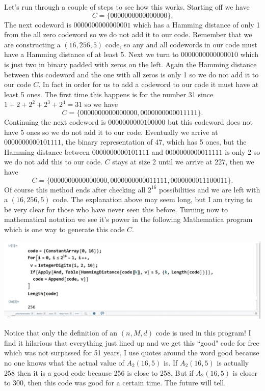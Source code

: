 \documentclass{article}
\theoremstyle{remark}
\begin{document}
	\noindent Let's run through a couple of steps to see how this works.  Starting off we have
	\begin{equation*}
		C=\{0000000000000000\}.
	\end{equation*}
	The next codeword is $0000000000000001$ which has a Hamming distance of only 1 from the all zero codeword so we do not add it to our code.  Remember that we are constructing a $(16,256,5)$ code, so any and all codewords in our code must have a Hamming distance of at least 5.  Next we turn to $0000000000000010$ which is just two in binary padded with zeros on the left.  Again the Hamming distance between this codeword and the one with all zeros is only 1 so we do not add it to our code $C$.  In fact in order for us to add a codeword to our code it must have at least 5 ones.  The first time this happens is for the number 31 since $1+2+2^2+2^3+2^4=31$ so we have
	\begin{equation*}
		C=\{0000000000000000,0000000000011111\}.
	\end{equation*}
	Continuing the next codeword is $0000000000100000$ but this codeword does not have 5 ones so we do not add it to our code.  Eventually we arrive at $0000000000101111$, the binary representation of 47, which has 5 ones, but the Hamming distance between $0000000000101111$ and $0000000000011111$ is only 2 so we do not add this to our code.  $C$ stays at size 2 until we arrive at 227, then we have
	\begin{equation*}
		C=\{0000000000000000,0000000000011111,0000000011100011\}.
	\end{equation*}
	Of course this method ends after checking all $2^{16}$ possibilities and we are left with a $(16,256,5)$ code.  The explanation above may seem long, but I am trying to be very clear for those who have never seen this before.  Turning now to mathematical notation we see it's power in the following Mathematica program which is one way to generate this code $C$.
	\begin{center}
		\includegraphics[width=15cm]{sequential code}
	\end{center}
	Notice that only the definition of an $(n,M,d)$ code is used in this program! I find it hilarious that everything just lined up and we get this ``good" code for free which was not surpassed for 51 years.  I use quotes around the word good because no one knows what the actual value of $A_2(16,5)$ is.  If $A_2(16,5)$ is actually 258 then it is a good code because 256 is close to 258.  But if $A_2(16,5)$ is closer to 300, then this code was good for a certain time.  The future will tell.
	
\end{document}
